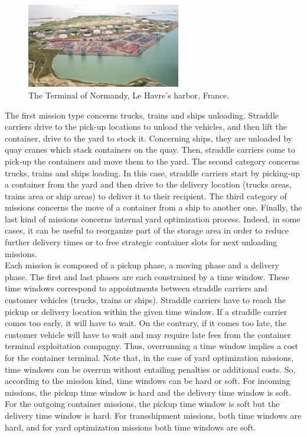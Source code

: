 \documentclass[a4paper,10pt]{article}
\begin{document}
\begin{figure}[ht]
  \begin{center}
  \includegraphics[width=0.6\textwidth]{Figures/terminalOfNormandy}
  \caption{The Terminal of Normandy, Le Havre's harbor, France.}
\end{center}
\end{figure}


The first mission type concerns trucks, trains and ships unloading. Straddle carriers drive to the pick-up locations to unload the vehicles, and then lift the container, drive to the yard to stock it. Concerning ships, they are unloaded by quay cranes which stack containers on the quay. Then, straddle carriers come to pick-up the containers and move them to the yard.
The second category concerns trucks, trains and ships loading. In this case, straddle carriers start by picking-up a container from the yard and then drive to the delivery location (trucks areas, trains area or ship areas) to deliver it to their recipient. 
The third category of missions concerns the move of a container from a ship to another one.
Finally, the last kind of missions concerns internal yard optimization process. Indeed, in some cases, it can be useful to reorganize part of the storage area in order to reduce further delivery times or to free strategic container slots for next unloading missions.\\

Each mission is composed of a pickup phase, a moving phase and a delivery phase. The first and last phases are each constrained by a time window. These time windows correspond to appointments between straddle carriers and customer vehicles (trucks, trains or ships). Straddle carriers have to reach the pickup or delivery location within the given time window. If a straddle carrier comes too early, it will have to wait. On the contrary, if it comes too late, the customer vehicle will have to wait and may require late fees from the container terminal exploitation compagny. Thus, overrunning a time window implies a cost for the container terminal. Note that, in the case of yard optimization missions, time windows can be overrun without entailing penalties or additional costs. So, according to the mission kind, time windows can be hard or soft. For incoming missions, the pickup time window is hard and the delivery time window is soft. For the outgoing container missions, the pickup time window is soft but the delivery time window is hard. For transshipment missions, both time windows are hard, and for yard optimization missions both time windows are soft. 
\end{document}
